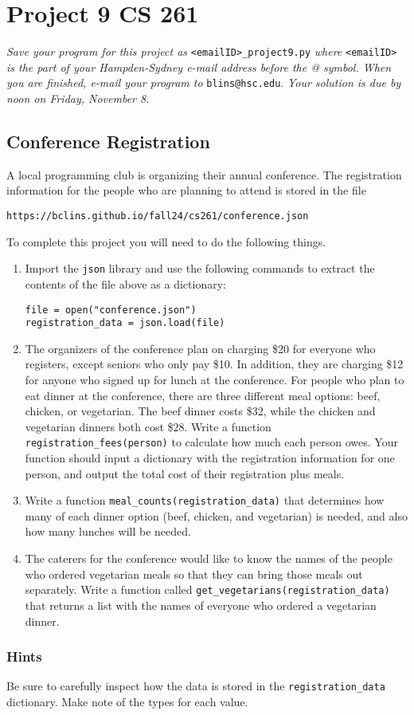 \documentclass[12pt]{article}
\begin{document}
\section*{Project 9 \hfill CS 261}

\textit{Save your program for this project as} \verb|<emailID>_project9.py| \textit{where} \verb|<emailID>| \textit{is the part of your Hampden-Sydney e-mail address before the @ symbol. When you are finished, e-mail your program to} \verb|blins@hsc.edu|. \textit{Your solution is due by noon on Friday, November 8. }

\subsection*{Conference Registration}

A local programming club is organizing their annual conference.  The registration information for the people who are planning to attend is stored in the file 
\begin{center}
\verb|https://bclins.github.io/fall24/cs261/conference.json|
\end{center}
To complete this project you will need to do the following things.

\begin{enumerate}
\item Import the \verb|json| library and use the following commands to extract the contents of the file above as a dictionary:
\begin{verbatim}
file = open("conference.json")
registration_data = json.load(file)
\end{verbatim}

\item The organizers of the conference plan on charging \$20 for everyone who registers, except seniors who only pay \$10.  In addition, they are charging \$12 for anyone who signed up for lunch at the conference.  For people who plan to eat dinner at the conference, there are three different meal options: beef, chicken, or vegetarian.  The beef dinner costs \$32, while the chicken and vegetarian dinners both cost \$28. Write a function \verb|registration_fees(person)| to calculate how much each person owes.  Your function should input a dictionary with the registration information for one person, and output the total cost of their registration plus meals. 

\item Write a function \verb|meal_counts(registration_data)| that determines how many of each dinner option (beef, chicken, and vegetarian) is needed, and also how many lunches will be needed. 

\item The caterers for the conference would like to know the names of the people who ordered vegetarian meals so that they can bring those meals out separately.  Write a function called \verb|get_vegetarians(registration_data)| that returns a list with the names of everyone who ordered a vegetarian dinner. 



\end{enumerate}

\subsubsection*{Hints}

Be sure to carefully inspect how the data is stored in the \verb|registration_data| dictionary.  Make note of the types for each value. 
\end{document}
